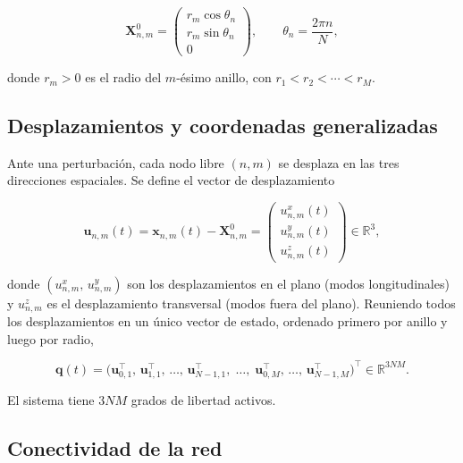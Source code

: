 \documentclass[11pt,letterpaper]{article}
\begin{document}
\begin{equation}\label{eq:equil}
    \mathbf{X}^{0}_{n,m}
    = \begin{pmatrix} r_m\cos\theta_n \\ r_m\sin\theta_n \\ 0
      \end{pmatrix},
    \qquad \theta_n = \frac{2\pi n}{N},
\end{equation}

donde $r_m > 0$ es el radio del $m$-ésimo anillo, con
$r_1 < r_2 < \cdots < r_M$.

\subsection{Desplazamientos y coordenadas generalizadas}

Ante una perturbación, cada nodo libre $(n,m)$ se desplaza en las tres
direcciones espaciales. Se define el vector de desplazamiento

\begin{equation}\label{eq:despl}
    \mathbf{u}_{n,m}(t)
    = \mathbf{x}_{n,m}(t) - \mathbf{X}^{0}_{n,m}
    = \begin{pmatrix} u^x_{n,m}(t) \\ u^y_{n,m}(t) \\ u^z_{n,m}(t)
      \end{pmatrix} \in \mathbb{R}^3,
\end{equation}

donde $(u^x_{n,m},\, u^y_{n,m})$ son los desplazamientos en el plano
(modos longitudinales) y $u^z_{n,m}$ es el desplazamiento transversal
(modos fuera del plano). Reuniendo todos los desplazamientos en un único
vector de estado, ordenado primero por anillo y luego por radio,

\begin{equation}\label{eq:q}
    \mathbf{q}(t)
    = \bigl(
        \mathbf{u}_{0,1}^\top,\,
        \mathbf{u}_{1,1}^\top,\,\dots,\,
        \mathbf{u}_{N-1,1}^\top,\;\dots,\;
        \mathbf{u}_{0,M}^\top,\,\dots,\,
        \mathbf{u}_{N-1,M}^\top
      \bigr)^\top
    \in \mathbb{R}^{3NM}.
\end{equation}

El sistema tiene $3NM$ grados de libertad activos.

\subsection{Conectividad de la red}
\end{document}
